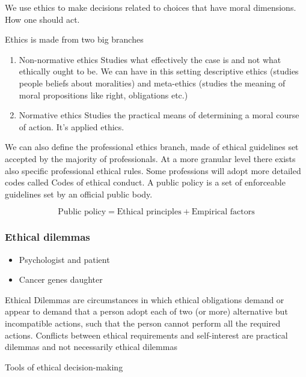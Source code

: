 We use ethics to make decisions related to choices that have moral dimensions. How one should act.

Ethics is made from two big branches

\begin{enumerate}
    \item Non-normative ethics \ra Studies what effectively the case is and not what ethically ought to be. We can have in this setting descriptive ethics (studies people beliefs about moralities) and meta-ethics (studies the meaning of moral propositions like right, obligations etc.)
    \item Normative ethics \ra Studies the practical means of determining a moral course of action. It's applied ethics.
\end{enumerate}

We can also define the professional ethics branch, made of ethical guidelines set accepted by the majority of professionals. At a more granular level there exists also specific professional ethical rules. Some professions will adopt more detailed codes called Codes of ethical conduct. A public policy is a set of enforceable guidelines set by an official public body. 

\[\text{Public policy} = \text{Ethical principles} + \text{Empirical factors}\]



\subsubsection{Ethical dilemmas}

\begin{itemize}
    \item Psychologist and patient
    \item Cancer genes daughter
\end{itemize}


Ethical Dilemmas are circumstances in which ethical obligations demand or
appear to demand that a person adopt each of two (or more) alternative but
incompatible actions, such that the person cannot perform all the required
actions. Conflicts between ethical requirements and self-interest are
 practical dilemmas
and not necessarily
 ethical dilemmas

\vspace{10pt}

Tools of ethical decision-making

